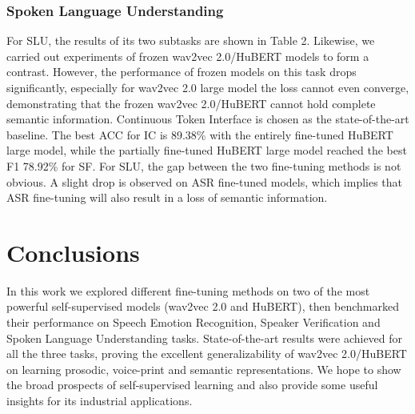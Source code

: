 \documentclass{article}
\begin{document}
\subsubsection{Spoken Language Understanding}
For SLU, the results of its two subtasks are shown in Table 2. Likewise, we carried out experiments of frozen wav2vec 2.0/HuBERT models to form a contrast. However, the performance of frozen models on this task drops significantly, especially for wav2vec 2.0 large model the loss cannot even converge, demonstrating that the frozen wav2vec 2.0/HuBERT cannot hold complete semantic information. Continuous Token Interface \cite{CTI} is chosen as the state-of-the-art baseline. The best ACC for IC is 89.38\% with the entirely fine-tuned HuBERT large model, while the partially fine-tuned HuBERT large model reached the best F1 78.92\% for SF. For SLU, the gap between the two fine-tuning methods is not obvious. A slight drop is observed on ASR fine-tuned models, which implies that ASR fine-tuning will also result in a loss of semantic information.




\section{Conclusions}
\label{sec:conclusions}

In this work we explored different fine-tuning methods on two of the most powerful self-supervised models (wav2vec 2.0 and HuBERT), then benchmarked their performance on Speech Emotion Recognition, Speaker Verification and Spoken Language Understanding tasks. State-of-the-art results were achieved for all the three tasks, proving the excellent generalizability of wav2vec 2.0/HuBERT on learning prosodic, voice-print and semantic representations. We hope to show the broad prospects of self-supervised learning and also provide some useful insights for its industrial applications. 




\clearpage



\end{document}
